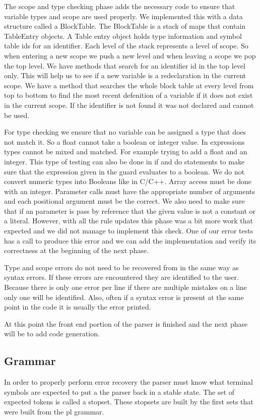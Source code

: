 \documentclass{article}
\begin{document}
The scope and type checking phase adds the necessary code to ensure that variable types and
scope are used properly. We implemented this with a data structure called a BlockTable.
The BlockTable is a stack of maps that contain TableEntry objects. A Table entry object holds
type information and symbol table ids for an identifier. Each level of the stack represents a
level of scope. So when entering a new scope we push a new level and when leaving a scope
we pop the top level. We have methods that search for an identifier id in the top level
only. This will help us to see if a new variable is a redeclaration in the current scope.
We have a method that searches the whole block table at every level from top to bottom to
find the most recent defenition of a variable if it does not exist in the current scope.
If the identifier is not found it was not declared and cannot be used.

For type checking we ensure that no variable can be assigned a type that does not match it.
So a float cannot take a boolean or integer value. In expressions types cannot be
mixed and matched. For example trying to add a float and an integer. This type of
testing can also be done in if and do statements to make sure that the expression
given in the guard evaluates to a boolean. We do not convert numeric types into Booleans
like in C/C++. Array access must be done with an integer. Parameter calls must have
the appropriate number of arguments and each positional argument must be the correct.
We also need to make sure that if an parameter is pass by reference that the given value
is not a constant or a literal. However, with all the rule updates this phase was a bit
more work that expected and we did not manage to implement this check. One of our error tests
has a call to produce this error and we can add the implementation and verify its
correctness at the beginning of the next phase.

Type and scope errors do not need to be recovered from in the same way as syntax
errors. If these errors are encountered they are identified to the user. Because
there is only one error per line if there are multiple mistakes on a line only one
will be identified. Also, often if a syntax error is present at the same point in the
code it is usually the error printed.

At this point the front end portion of the parser is finished and the next phase will be to
add code generation.

\subsection{Grammar}
In order to properly perform error recovery the parser must know what terminal symbols are expected
to put a the parser back in a stable state. The set of expected tokens is called a stopset.
These stopsets are built by the first sets that were built from the pl grammar.
\end{document}
